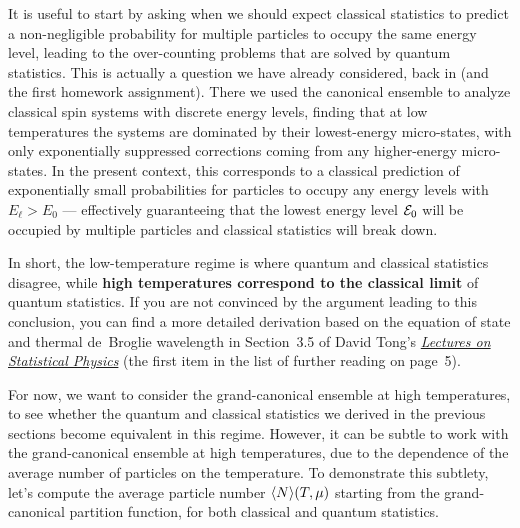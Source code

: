 It is useful to start by asking when we should expect classical statistics to predict a non-negligible probability for multiple particles to occupy the same energy level, leading to the over-counting problems that are solved by quantum statistics.
This is actually a question we have already considered, back in  (and the first homework assignment).
There we used the canonical ensemble to analyze classical spin systems with discrete energy levels, finding that at low temperatures the systems are dominated by their lowest-energy micro-states, with only exponentially suppressed corrections coming from any higher-energy micro-states.
In the present context, this corresponds to a classical prediction of exponentially small probabilities for particles to occupy any energy levels with $E_{\ell} > E_0$ --- effectively guaranteeing that the lowest energy level $\mathcal E_0$ will be occupied by multiple particles and classical statistics will break down.

In short, the low-temperature regime is where quantum and classical statistics disagree, while \textbf{high temperatures correspond to the classical limit} of quantum statistics.
If you are not convinced by the argument leading to this conclusion, you can find a more detailed derivation based on the equation of state and thermal de~Broglie wavelength in Section~3.5 of David Tong's \href{https://www.damtp.cam.ac.uk/user/tong/statphys.html}{\textit{Lectures on Statistical Physics}} (the first item in the list of further reading on page~5).

For now, we want to consider the grand-canonical ensemble at high temperatures, to see whether the quantum and classical statistics we derived in the previous sections become equivalent in this regime.
However, it can be subtle to work with the grand-canonical ensemble at high temperatures, due to the dependence of the average number of particles on the temperature.
To demonstrate this subtlety, let's compute the average particle number $\left\langle N \right\rangle\!(T, \mu)$ starting from the grand-canonical partition function, for both classical and quantum statistics.

